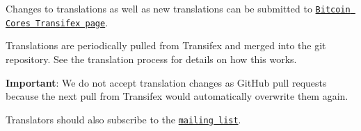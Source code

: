 Changes to translations as well as new translations can be submitted to \href{https://www.transifex.com/projects/p/bitcoin/}{\tt Bitcoin Core\textquotesingle{}s Transifex page}.

Translations are periodically pulled from Transifex and merged into the git repository. See the translation process for details on how this works.

{\bfseries Important}\+: We do not accept translation changes as Git\+Hub pull requests because the next pull from Transifex would automatically overwrite them again.

Translators should also subscribe to the \href{https://groups.google.com/forum/#!forum/bitcoin-translators}{\tt mailing list}. 